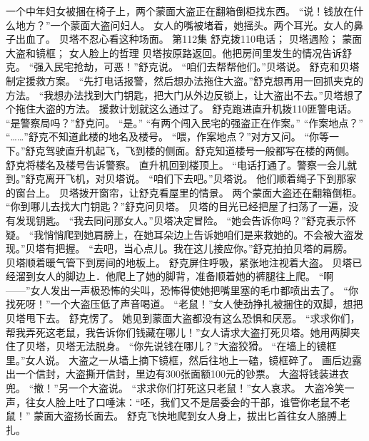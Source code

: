 \documentclass[a4paper,12pt,UTF8,twoside]{ctexbook}
\begin{document}
        一个中年妇女被捆在椅子上，两个蒙面大盗正在翻箱倒柜找东西。 
        “说！钱放在什么地方？”一个蒙面大盗问妇人。 
        女人的嘴被堵着，她摇头。两个耳光。女人的鼻子出血了。 
        贝塔不忍心看这种场面。   第112集 
        舒克拨110电话； 
        贝塔遇险； 
        蒙面大盗和镜框； 
        女人脸上的哲理   
        贝塔按原路返回。他把房间里发生的情况告诉舒克。 
        “强入民宅抢劫，可恶！”舒克说。 
        “咱们去帮帮他们。”贝塔说。 
        舒克和贝塔制定援救方案。 
        “先打电话报警，然后想办法拖住大盗。”舒克想再用一回抓夹克的方法。 
        “我想办法找到大门钥匙，把大门从外边反锁上，让大盗出不去。”贝塔想了个拖住大盗的方法。 
        援救计划就这么通过了。 
        舒克跑进直升机拨110匪警电话。 
        “是警察局吗？”舒克问。 
        “是。” 
        “有两个闯入民宅的强盗正在作案。” 
        “作案地点？” 
        “……”舒克不知道此楼的地名及楼号。 
        “喂，作案地点？”对方又问。 
        “你等一下。”舒克驾驶直升机起飞，飞到楼的侧面。舒克知道楼号一般都写在楼的两侧。 
        舒克将楼名及楼号告诉警察。 
        直升机回到楼顶上。 
        “电话打通了。警察一会儿就到。”舒克离开飞机，对贝塔说。 
        “咱们下去吧。”贝塔说。 
        他们顺着绳子下到那家的窗台上。 
        贝塔拨开窗帘，让舒克看屋里的情景。 
        两个蒙面大盗还在翻箱倒柜。 
        “你到哪儿去找大门钥匙？”舒克问贝塔。 
        贝塔的目光已经把屋了扫荡了一遍，没有发现钥匙。 
        “我去同问那女人。”贝塔决定冒险。 
        “她会告诉你吗？”舒克表示怀疑。 
        “我悄悄爬到她肩膀上，在她耳朵边上告诉她咱们是来救她的。不会被大盗发现。”贝塔有把握。 
        “去吧，当心点儿。我在这儿接应你。”舒克拍拍贝塔的肩膀。 
        贝塔顺着暖气管下到房间的地板上。 
        舒克屏住呼吸，紧张地注视着大盗。 
        贝塔已经溜到女人的脚边上．他爬上了她的脚背，准备顺着她的裤腿往上爬。 
        “啊——”女人发出一声极恐怖的尖叫，恐怖得使她把嘴里塞的毛巾都喷出去了。 
        “你找死呀！”一个大盗压低了声音喝道。 
        “老鼠！”女人使劲挣扎被捆住的双脚，想把贝塔甩下去。 
        舒克愣了。 
        她见到蒙面大盗都没有这么恐惧和厌恶。 
        “求求你们，帮我弄死这老鼠，我告诉你们钱藏在哪儿！”女人请求大盗打死贝塔。她用两脚夹住了贝塔，贝塔无法脱身。 
        “你先说钱在哪儿？”大盗狡猾。 
        “在墙上的镜框里。”女人说。 
        大盗之一从墙上摘下镜框，然后往地上一磕，镜框碎了。 
        画后边露出一个信封，大盗撕开信封，里边有300张面额100元的钞票。 
        大盗将钱装进衣兜。 
        “撤！”另一个大盗说。 
        “求求你们打死这只老鼠！”女人哀求。 
        大盗冷笑一声，往女人脸上吐了口唾沫：“呸，我们又不是居委会的干部，谁管你老鼠不老鼠！” 
        蒙面大盗扬长面去。 
        舒克飞快地爬到女人身上，拔出匕首往女人胳膊上扎。 
\end{document}
